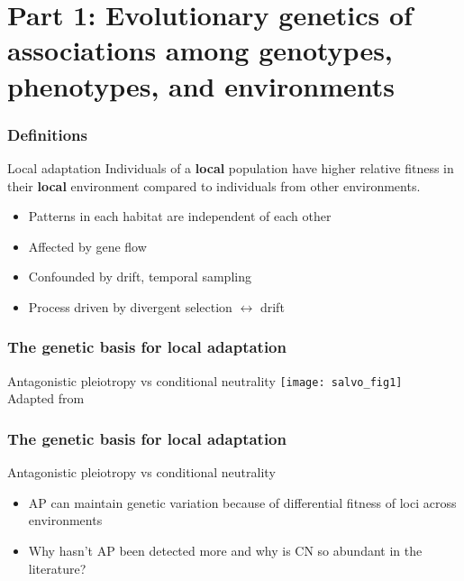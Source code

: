 
\section[Part 1]{Part 1: Evolutionary genetics of associations among
genotypes, phenotypes, and environments}

\begin{frame}
\frametitle{Definitions}
\begin{block}{Local adaptation}
\centering
Individuals of a \textbf{local} population have higher relative fitness in 
their \textbf{local} environment compared to individuals from other 
environments.
\end{block}

\begin{block}{}
\begin{itemize}
\item{Patterns in each habitat are independent of each other}
\item{Affected by gene flow}
\item{Confounded by drift, temporal sampling}
\item{Process driven by divergent selection $\longleftrightarrow$ drift}
\end{itemize}
\end{block}
\tiny
\citet{Kawecki:2004hxa}
\end{frame}


\begin{frame}
\frametitle{The genetic basis for local adaptation}
\begin{block}{Antagonistic pleiotropy vs conditional
neutrality}
\centering
\texttt{[image: salvo\_fig1]}\\
\tiny
Adapted from \citet[Figure 1]{Savolainen:2013dfa}
\end{block}
\end{frame}


\begin{frame}
\frametitle{The genetic basis for local adaptation}
\begin{block}{Antagonistic pleiotropy vs conditional
neutrality}
\begin{itemize}
\item{AP can maintain genetic variation because of differential fitness of
loci across environments}
\item{Why hasn't AP been detected more and why is CN so abundant in the
literature?}
\end{itemize}
\end{block}
\tiny
\citet{MitchellOlds:2007di, Anderson:2012cb}
\end{frame}

